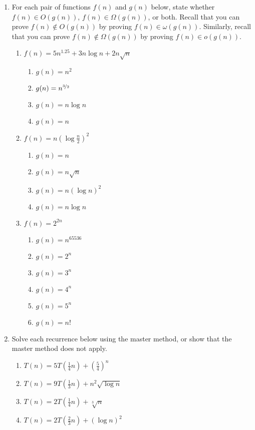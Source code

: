 \documentclass{article}
\begin{document}
\begin{enumerate}
  \pagebreak[2]
\item
  For each pair of functions \(f(n)\) and \(g(n)\) below, state whether
  \mbox{\(f(n) \in O(g(n))\)}, \mbox{\(f(n) \in \Omega(g(n))\)}, or both.
  Recall that you can prove \mbox{\(f(n) \not\in O(g(n))\)} by proving
  \mbox{\(f(n) \in \omega(g(n))\)}.  Similarly, recall that you can prove
  \mbox{\(f(n) \not\in \Omega(g(n))\)} by proving \mbox{\(f(n) \in o(g(n))\)}.
  \begin{enumerate}
  \item \(f(n) = 5n^{1.25} + 3n\log n + 2 n\sqrt{n}\)
    \begin{enumerate}
    \item \(g(n) = n^2\)
    \item \(g(n) = n^{\nicefrac{3}{2}}\)
    \item \(g(n) = n\log n\)
    \item \(g(n) = n\)
    \end{enumerate}
  \item \(f(n) = n (\log \frac{n}{2})^2\)
    \begin{enumerate}
    \item \(g(n) = n\)
    \item \(g(n) = n \sqrt{n}\)
    \item \(g(n) = n (\log n)^2\)
    \item \(g(n) = n \log n\)
    \end{enumerate}
  \item \(f(n) = 2^{2n}\)
    \begin{enumerate}
      \item \(g(n) = n^{65536}\)
      \item \(g(n) = 2^n\)
      \item \(g(n) = 3^n\)
      \item \(g(n) = 4^n\)
      \item \(g(n) = 5^n\)
      \item \(g(n) = n!\)
    \end{enumerate}
  \end{enumerate}

  \pagebreak[2]
\item
  Solve each recurrence below using the master method, or show that the
  master method does not apply.
  \begin{enumerate}
  \item \(T(n) = 5T(\frac{1}{4}n) + (\frac{5}{4})^n\)
  \item \(T(n) = 9T(\frac{1}{3}n) + n^2\sqrt{\log n}\)
  \item \(T(n) = 2T(\frac{1}{4}n) + \sqrt[3]{n}\)
  \item \(T(n) = 2T(\frac{2}{3}n) + (\log n)^2\)
  \end{enumerate}

\end{enumerate}
\end{document}
